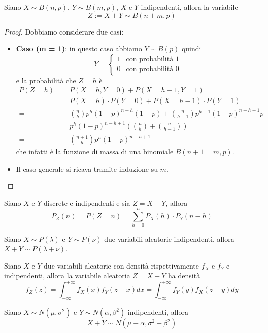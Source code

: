 \begin{proposition}
	Siano $X \sim B(n, p)$, $Y \sim B(m, p)$, $X$ e $Y$ indipendenti, allora la variabile
	\[ Z := X + Y \sim B(n + m, p) \]
	\begin{proof}
		Dobbiamo considerare due casi:
		\begin{itemize}
			\item \textbf{Caso (m = 1)}: in questo caso abbiamo $Y \sim B(p)$ quindi
			      \[
				      Y = \begin{cases}
					      1 & \text{con probabilità } 1 \\
					      0 & \text{con probabilità } 0
				      \end{cases}
			      \]
			      e la probabilità che $Z = h$ è
			      \begin{align*}
				      P(Z = h) = & P(X = h, Y = 0) + P(X = h-1, Y = 1)                          \\
				      =          & P(X = h) \cdot P(Y = 0) + P(X = h-1) \cdot P(Y = 1)          \\
				      =          & \binom{n}{h} p^h (1-p)^{n-h} (1-p) +
				      \binom{n}{h-1} p^{h-1} (1-p)^{n-h+1} p                                    \\
				      =          & p^h (1-p)^{n-h+1} \left(\binom{n}{h} + \binom{n}{h-1}\right) \\
				      =          & \binom{n+1}{h} p^h (1-p)^{n-h+1}
			      \end{align*}
			      che infatti è la funzione di massa di una binomiale $B(n+1 = m, p)$.
			\item Il caso generale si ricava tramite induzione su $m$.
		\end{itemize}
	\end{proof}
\end{proposition}

\begin{proposition}
	Siano $X$ e $Y$ discrete e indipendenti e sia $Z = X + Y$, allora
	\[ P_Z(n) = P(Z = n) = \sum_{h=0}^n P_X(h) \cdot P_Y(n-h) \]
\end{proposition}

\begin{proposition}
	Siano $X \sim P(\lambda)$ e $Y \sim P(\nu)$ due variabili aleatorie indipendenti, allora
	$X+Y \sim P(\lambda + \nu)$.
\end{proposition}

\begin{proposition}[Convoluzione]
	Siano $X$ e $Y$ due variabili aleatorie con densità rispettivamente $f_X$ e $f_Y$ e
	indipendenti, allora la variabile aleatoria $Z = X + Y$ ha densità
	\[
		f_Z (z) = \int_{-\infty}^{+\infty} f_X (x) f_Y (z - x) dx =
		\int_{-\infty}^{+\infty} f_Y (y) f_X (z - y) dy
	\]
\end{proposition}

\begin{proposition}\label{prop: riprod_gauss}
	Siano $X \sim N(\mu, \sigma^2)$ e $Y \sim N(\alpha, \beta^2)$ indipendenti, allora
	\[ X + Y \sim N(\mu + \alpha, \sigma^2 + \beta^2) \]
\end{proposition}